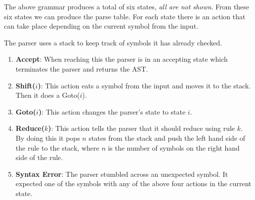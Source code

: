 \begin{figure}[H]
\end{figure}

The above grammar produces a total of six states, \textit{all are not shown}. From these six states we can produce the parse table. For each state there is an action that can take place depending on the current symbol from the input. 

The parser uses a stack to keep track of symbols it has already checked.

\begin{enumerate}
  \item \textbf{Accept}: When reaching this the parser is in an accepting state which terminates the parser and returns the AST.
  \item \textbf{Shift($i$)}: This action eats a symbol from the input and moves it to the stack. Then it does a Goto($i$). 
  \item \textbf{Goto($i$)}: This action changes the parser's state to state $i$.
  \item \textbf{Reduce($k$)}: This action tells the parser that it should reduce using rule $k$. By doing this it pops $n$ states from the stack and push the left hand side of the rule to the stack, where $n$ is the number of symbols on the right hand side of the rule.
  \item \textbf{Syntax Error}: The parser stumbled across an unexpected symbol. It expected one of the symbols with any of the above four actions in the current state.
\end{enumerate}

